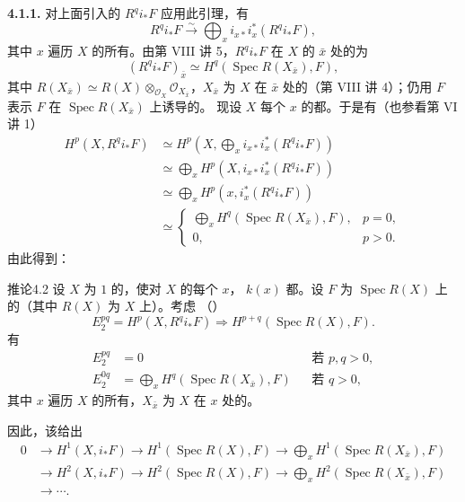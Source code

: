 \textbf{4.1.1.} 对上面引入的 $R^qi_*F$ 应用此引理，有
\[
R^qi_*F\xrightarrow{\sim}\bigoplus_xi_{x*}i_x^*(R^qi_*F),
\]
其中 $x$ 遍历 $X$ 的所有。由第 VIII 讲 5，$R^qi_*F$ 在 $X$ 的 $\bar x$ 处的为
\[
(R^qi_*F)_{\bar x}\simeq H^q(\operatorname{Spec}R(X_{\bar x}),F),
\]
其中 $R(X_{\bar x})\simeq R(X)\otimes_{\mathcal O_X}\mathcal O_{X_{\bar x}}$，$X_{\bar x}$ 为 $X$ 在 $\bar x$ 处的（第 VIII 讲 4）；仍用 $F$ 表示 $F$ 在 $\operatorname{Spec}R(X_{\bar x})$ 上诱导的。
现设 $X$ 每个 $x$ 的都。于是有（也参看第 VI 讲 1）
\[
\begin{aligned}
H^p(X,R^qi_*F)
&\simeq H^p\left(X,\bigoplus_xi_{x*}i_x^*(R^qi_*F)\right)\\
&\simeq\bigoplus_xH^p(X,i_{x*}i_x^*(R^qi_*F))\\
&\simeq\bigoplus_xH^p(x,i_x^*(R^qi_*F))\\
&\simeq\begin{cases}
\displaystyle\bigoplus_xH^q(\operatorname{Spec}R(X_{\bar x}),F),&p=0,\\
0,&p>0.
\end{cases}
\end{aligned}
\]
由此得到：
\begin{SGAresult}{推论}{4.2}
设 $X$ 为 $1$ 的，使对 $X$ 的每个 $x$， $k(x)$ 都。设 $F$ 为 $\operatorname{Spec}R(X)$ 上的（其中 $R(X)$ 为 $X$ 上）。考虑 （）
\[
E_2^{pq}=H^p(X,R^qi_*F)\Longrightarrow H^{p+q}(\operatorname{Spec}R(X),F).
\]
有
\[
\begin{aligned}
E_2^{pq}&=0&&\text{若 }p,q>0,\\
E_2^{0q}&=\bigoplus_xH^q(\operatorname{Spec}R(X_{\bar x}),F)&&\text{若 }q>0,
\end{aligned}
\]
其中 $x$ 遍历 $X$ 的所有，$X_{\bar x}$ 为 $X$ 在 $x$ 处的。

因此，该给出
\[
\begin{aligned}
0&\longrightarrow H^1(X,i_*F)\longrightarrow H^1(\operatorname{Spec}R(X),F)
 \longrightarrow\bigoplus_xH^1(\operatorname{Spec}R(X_{\bar x}),F)\\
&\longrightarrow H^2(X,i_*F)\longrightarrow H^2(\operatorname{Spec}R(X),F)
 \longrightarrow\bigoplus_xH^2(\operatorname{Spec}R(X_{\bar x}),F)\\
&\longrightarrow\cdots.
\end{aligned}
\]
\end{SGAresult}
